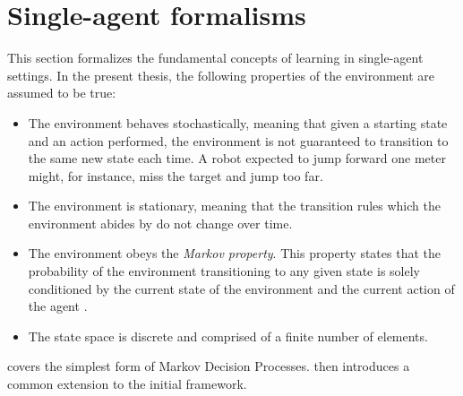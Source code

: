 \section{Single-agent formalisms}
\label{sec:sarl}
This section formalizes the fundamental concepts of learning in single-agent settings. In the present thesis, the following properties of the environment are assumed to be true:
\begin{itemize}
    \item The environment behaves stochastically, meaning that given a starting state and an action performed, the environment is not guaranteed to transition to the same new state each time. A robot expected to jump forward one meter might, for instance, miss the target and jump too far.
    \item The environment is stationary, meaning that the transition rules which the environment abides by do not change over time. 
    \item The environment obeys the \textit{Markov property}. This property states that the probability of the environment transitioning to any given state is solely conditioned by the current state of the environment and the current action of the agent \cite{Russell:2009:AIM:1671238}.
    \item The state space is discrete and comprised of a finite number of elements. 
\end{itemize}
 covers the simplest form of Markov Decision Processes.  then introduces a common extension to the initial framework.


